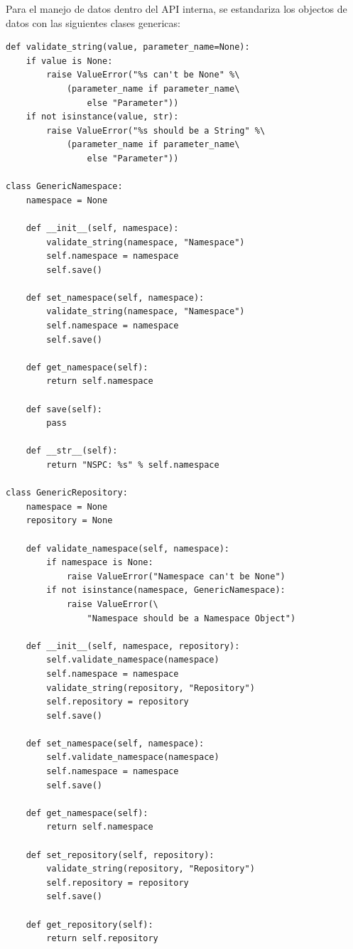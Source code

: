 Para el manejo de datos dentro del API interna, se estandariza los objectos de datos con las siguientes clases genericas:
\lstset{language=Python}
\begin{lstlisting}
def validate_string(value, parameter_name=None):
    if value is None:
        raise ValueError("%s can't be None" %\
            (parameter_name if parameter_name\
                else "Parameter"))
    if not isinstance(value, str):
        raise ValueError("%s should be a String" %\
            (parameter_name if parameter_name\
                else "Parameter"))

class GenericNamespace:
    namespace = None

    def __init__(self, namespace):
        validate_string(namespace, "Namespace")
        self.namespace = namespace
        self.save()

    def set_namespace(self, namespace):
        validate_string(namespace, "Namespace")
        self.namespace = namespace
        self.save()

    def get_namespace(self):
        return self.namespace

    def save(self):
        pass

    def __str__(self):
        return "NSPC: %s" % self.namespace

class GenericRepository:
    namespace = None
    repository = None

    def validate_namespace(self, namespace):
        if namespace is None:
            raise ValueError("Namespace can't be None")
        if not isinstance(namespace, GenericNamespace):
            raise ValueError(\
                "Namespace should be a Namespace Object")

    def __init__(self, namespace, repository):
        self.validate_namespace(namespace)
        self.namespace = namespace
        validate_string(repository, "Repository")
        self.repository = repository
        self.save()

    def set_namespace(self, namespace):
        self.validate_namespace(namespace)
        self.namespace = namespace
        self.save()

    def get_namespace(self):
        return self.namespace

    def set_repository(self, repository):
        validate_string(repository, "Repository")
        self.repository = repository
        self.save()

    def get_repository(self):
        return self.repository


\end{lstlisting}
